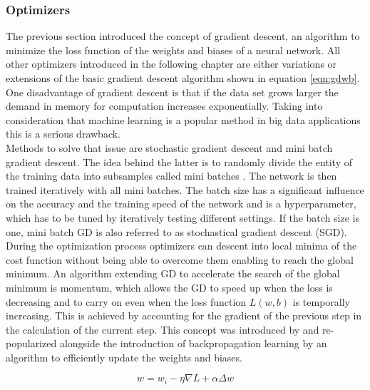 \subsubsection{Optimizers}
The previous section introduced the concept of gradient descent, an algorithm to minimize
the loss function of the weights and biases of a neural network. All other optimizers
introduced in
the following chapter are either variations or extensions of the basic gradient descent algorithm shown in equation \ref{eqn:gdwb}. \\
One disadvantage of gradient descent is that if the data set grows larger the demand in
memory for computation increases exponentially. Taking into consideration that machine
learning is a popular method in big data applications this is a serious drawback.\\
Methods to solve that issue are stochastic gradient descent and mini batch gradient
descent. The idea behind the latter is to randomly divide the entity of the training data
into subsamples called mini batches \cite{bottou-bousquet-2008}. The network is then
trained iteratively with all mini batches. The batch size has a significant influence on
the accuracy and the training speed of the network and is a hyperparameter, which has to
be tuned by iteratively testing different settings. If
the batch size is one, mini batch GD is also referred to as stochastical gradient descent (SGD). \\
During the optimization process optimizers can descent into local minima of the cost
function without being able to overcome them enabling to reach the global minimum. An
algorithm extending GD to accelerate the search of the global minimum is momentum, which
allows the GD to speed up when the loss is decreasing and to carry on even when the loss
function $L(w,b)$ is temporally increasing. This is achieved by accounting for the
gradient of the previous step in the calculation of the current step. This concept was
introduced by \cite{polyak1964} and re-popularized alongside the introduction of
backpropagation learning by \cite{rumelhart1988learning} an algorithm to efficiently
update the weights and biases.

\begin{equation}
 w = w_i - \eta \nabla L + \alpha \Delta w
 \label{eqn:momentum}
\end{equation}

